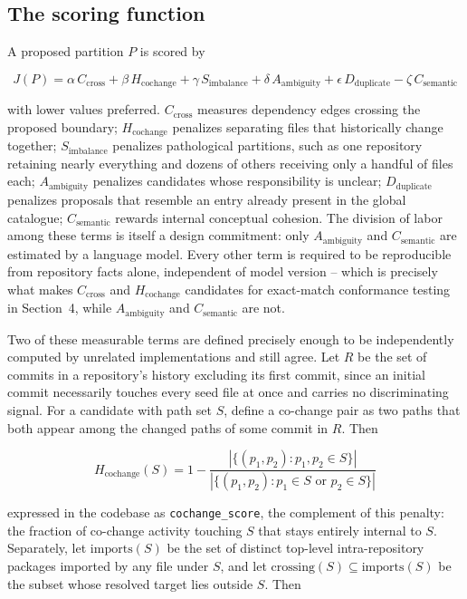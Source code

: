 \documentclass[11pt]{article}
\begin{document}
\subsection{The scoring function}

A proposed partition $P$ is scored by

\begin{equation}
J(P) = \alpha\, C_{\mathrm{cross}} + \beta\, H_{\mathrm{cochange}} + \gamma\, S_{\mathrm{imbalance}} + \delta\, A_{\mathrm{ambiguity}} + \epsilon\, D_{\mathrm{duplicate}} - \zeta\, C_{\mathrm{semantic}}
\end{equation}

with lower values preferred. $C_{\mathrm{cross}}$ measures dependency edges crossing the proposed boundary; $H_{\mathrm{cochange}}$ penalizes separating files that historically change together; $S_{\mathrm{imbalance}}$ penalizes pathological partitions, such as one repository retaining nearly everything and dozens of others receiving only a handful of files each; $A_{\mathrm{ambiguity}}$ penalizes candidates whose responsibility is unclear; $D_{\mathrm{duplicate}}$ penalizes proposals that resemble an entry already present in the global catalogue; $C_{\mathrm{semantic}}$ rewards internal conceptual cohesion. The division of labor among these terms is itself a design commitment: only $A_{\mathrm{ambiguity}}$ and $C_{\mathrm{semantic}}$ are estimated by a language model. Every other term is required to be reproducible from repository facts alone, independent of model version -- which is precisely what makes $C_{\mathrm{cross}}$ and $H_{\mathrm{cochange}}$ candidates for exact-match conformance testing in Section~4, while $A_{\mathrm{ambiguity}}$ and $C_{\mathrm{semantic}}$ are not.

Two of these measurable terms are defined precisely enough to be independently computed by unrelated implementations and still agree. Let $R$ be the set of commits in a repository's history excluding its first commit, since an initial commit necessarily touches every seed file at once and carries no discriminating signal. For a candidate with path set $S$, define a co-change pair as two paths that both appear among the changed paths of some commit in $R$. Then

\begin{equation}
H_{\mathrm{cochange}}(S) = 1 - \frac{|\{(p_1,p_2) : p_1, p_2 \in S\}|}{|\{(p_1,p_2) : p_1 \in S \text{ or } p_2 \in S\}|}
\end{equation}

expressed in the codebase as \texttt{cochange\_score}, the complement of this penalty: the fraction of co-change activity touching $S$ that stays entirely internal to $S$. Separately, let $\mathrm{imports}(S)$ be the set of distinct top-level intra-repository packages imported by any file under $S$, and let $\mathrm{crossing}(S) \subseteq \mathrm{imports}(S)$ be the subset whose resolved target lies outside $S$. Then
\end{document}
